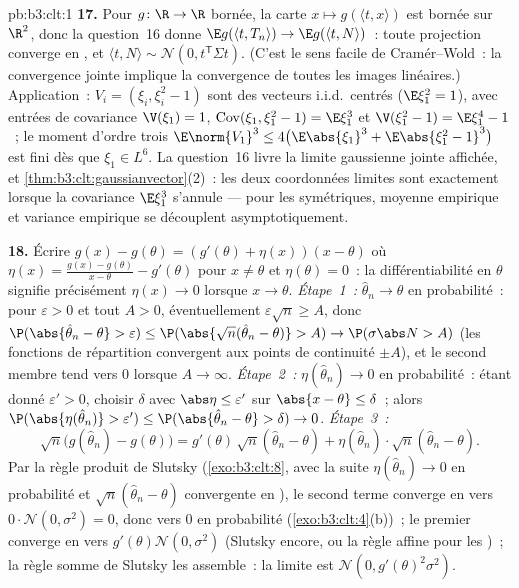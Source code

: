 \begin{solution}{pb:b3:clt:1}
\textbf{17.} Pour $g \colon \R \to \R$  bornée, la
carte $x \mapsto g(\langle t, x\rangle)$ est 
bornée sur $\R^2$, donc la question~16 donne $\E g(\langle
t, T_n\rangle) \to \E g(\langle t, N\rangle)$~: toute
projection converge en , et $\langle t, N\rangle \sim
\mathcal N(0, t^{\mathsf T}\Sigma t)$. (C'est le sens
facile de Cramér--Wold~: la convergence jointe implique la
convergence de toutes les images linéaires.) Application~:
$V_i = (\xi_i, \xi_i^2 - 1)$ sont des vecteurs i.i.d.\
centrés ($\E\xi_1^2 = 1$), avec entrées de covariance
$\V(\xi_1) = 1$, $\operatorname{Cov}(\xi_1, \xi_1^2 - 1) =
\E\xi_1^3$ et $\V(\xi_1^2 - 1) = \E\xi_1^4 - 1$~; le moment
d'ordre trois $\E\norm{V_1}^3 \leq 4\bigl(\E\abs{\xi_1}^3 +
\E\abs{\xi_1^2 - 1}^3\bigr)$ est fini dès que $\xi_1 \in
L^6$. La question~16 livre la limite gaussienne jointe
affichée, et \cref{thm:b3:clt:gaussianvector}(2)~: les deux
coordonnées limites sont  exactement lorsque la
covariance $\E\xi_1^3$ s'annule --- pour les \omterm{def:b3:probability:space}{lois}
symétriques, moyenne empirique et variance empirique se
découplent asymptotiquement.

\textbf{18.} Écrire $g(x) - g(\theta) = (g'(\theta) +
\eta(x))(x - \theta)$ où $\eta(x) = \frac{g(x) -
g(\theta)}{x - \theta} - g'(\theta)$ pour $x \neq \theta$
et $\eta(\theta) = 0$~: la différentiabilité en $\theta$
signifie précisément $\eta(x) \to 0$ lorsque $x \to \theta$.
\emph{Étape~1~:} $\hat\theta_n \to \theta$ en probabilité~:
pour $\varepsilon > 0$ et tout $A > 0$, éventuellement
$\varepsilon\sqrt n \geq A$, donc $\P(\abs{\hat\theta_n -
\theta} > \varepsilon) \leq \P(\abs{\sqrt
n(\hat\theta_n - \theta)} > A) \to \P(\sigma\abs N > A)$
(les fonctions de répartition convergent aux points de
continuité $\pm A$), et le second membre tend vers $0$
lorsque $A \to \infty$. \emph{Étape~2~:} $\eta(\hat\theta_n)
\to 0$ en probabilité~: étant donné $\varepsilon' > 0$,
choisir $\delta$ avec $\abs\eta \leq \varepsilon'$ sur
$\abs{x - \theta} \leq \delta$~; alors
$\P(\abs{\eta(\hat\theta_n)} > \varepsilon') \leq
\P(\abs{\hat\theta_n - \theta} > \delta) \to 0$.
\emph{Étape~3~:}
\[
\sqrt n\bigl(g(\hat\theta_n) - g(\theta)\bigr) =
g'(\theta)\,\sqrt n(\hat\theta_n - \theta) +
\eta(\hat\theta_n)\cdot\sqrt n(\hat\theta_n - \theta) .
\]
Par la règle produit de Slutsky (\cref{exo:b3:clt:8}, avec
la suite $\eta(\hat\theta_n) \to 0$ en probabilité et
$\sqrt n(\hat\theta_n - \theta)$ convergente en ), le
second terme converge en \omterm{def:b3:probability:space}{loi} vers $0\cdot\mathcal N(0,
\sigma^2) = 0$, donc vers $0$ en probabilité
(\cref{exo:b3:clt:4}(b))~; le premier converge en  vers
$g'(\theta)\mathcal N(0, \sigma^2)$ (Slutsky encore, ou la
règle affine pour les )~; la règle
somme de Slutsky les assemble~: la limite est $\mathcal
N(0, g'(\theta)^2\sigma^2)$.


\end{solution}
